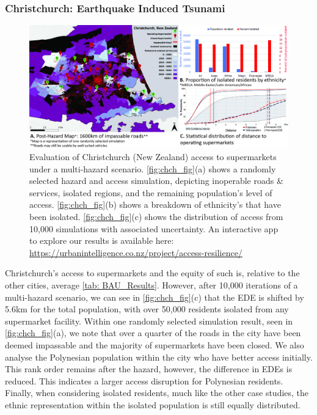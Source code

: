 \documentclass[review,3p,times,onecolumn,sort&compress,12pt]{elsarticle}
\begin{document}
\subsubsection{Christchurch: Earthquake Induced Tsunami}
\begin{figure}[h!]
    \includegraphics[width=1\linewidth]{report/fig/ch_fig.jpg}
    \caption{Evaluation of Christchurch (New Zealand) access to supermarkets under a multi-hazard scenario. \autoref{fig:chch_fig}(a) shows a randomly selected hazard and access simulation, depicting inoperable roads \& services, isolated regions, and the remaining population's level of access. \autoref{fig:chch_fig}(b) shows a breakdown of ethnicity's that have been isolated. \autoref{fig:chch_fig}(c) shows the distribution of access from 10,000 simulations with associated uncertainty. An interactive app to explore our results is available here: \url{https://urbanintelligence.co.nz/project/access-resilience/}}
    \label{fig:chch_fig}
\end{figure}

Christchurch's access to supermarkets and the equity of such is, relative to the other cities, average \autoref{tab: BAU_Results}. 
However, after 10,000 iterations of a multi-hazard scenario, we can see in \autoref{fig:chch_fig}(c) that the EDE is shifted by 5.6km for the total population, with over 50,000 residents isolated from any supermarket facility.
Within one randomly selected simulation result, seen in \autoref{fig:chch_fig}(a), we note that over a quarter of the roads in the city have been deemed impassable and the majority of supermarkets have been closed.
We also analyse the Polynesian population within the city who have better access initially.
This rank order remains after the hazard, however, the difference in EDEs is reduced.
This indicates a larger access disruption for Polynesian residents.
Finally, when considering isolated residents, much like the other case studies, the ethnic representation within the isolated population is still equally distributed.
\end{document}
